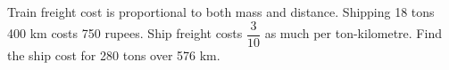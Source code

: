 Train freight cost is proportional to both mass and distance. Shipping 18 tons 400 km costs 750 rupees. Ship freight costs $\dfrac{3}{10}$ as much per ton-kilometre. Find the ship cost for 280 tons over 576 km.
